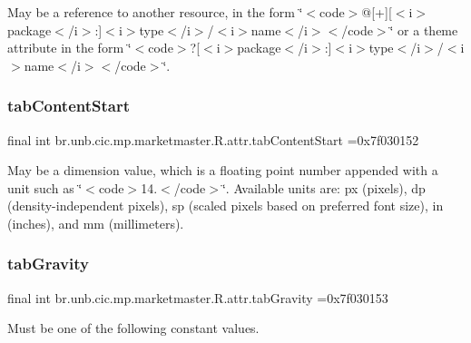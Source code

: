 May be a reference to another resource, in the form \char`\"{}$<$code$>$@\mbox{[}+\mbox{]}\mbox{[}$<$i$>$package$<$/i$>$\+:\mbox{]}$<$i$>$type$<$/i$>$/$<$i$>$name$<$/i$>$$<$/code$>$\char`\"{} or a theme attribute in the form \char`\"{}$<$code$>$?\mbox{[}$<$i$>$package$<$/i$>$\+:\mbox{]}$<$i$>$type$<$/i$>$/$<$i$>$name$<$/i$>$$<$/code$>$\char`\"{}. \mbox{\label{classbr_1_1unb_1_1cic_1_1mp_1_1marketmaster_1_1R_1_1attr_aa8f6ecc30bafd72732b85613b10b5a12}} 
\subsubsection{\texorpdfstring{tab\+Content\+Start}{tabContentStart}}
{\footnotesize\ttfamily final int br.\+unb.\+cic.\+mp.\+marketmaster.\+R.\+attr.\+tab\+Content\+Start =0x7f030152\hspace{0.3cm}{\ttfamily [static]}}

May be a dimension value, which is a floating point number appended with a unit such as \char`\"{}$<$code$>$14.\+5sp$<$/code$>$\char`\"{}. Available units are\+: px (pixels), dp (density-\/independent pixels), sp (scaled pixels based on preferred font size), in (inches), and mm (millimeters). \mbox{\label{classbr_1_1unb_1_1cic_1_1mp_1_1marketmaster_1_1R_1_1attr_abf9389aa847135cebdbb6300a5f2697d}} 
\subsubsection{\texorpdfstring{tab\+Gravity}{tabGravity}}
{\footnotesize\ttfamily final int br.\+unb.\+cic.\+mp.\+marketmaster.\+R.\+attr.\+tab\+Gravity =0x7f030153\hspace{0.3cm}{\ttfamily [static]}}

Must be one of the following constant values.

